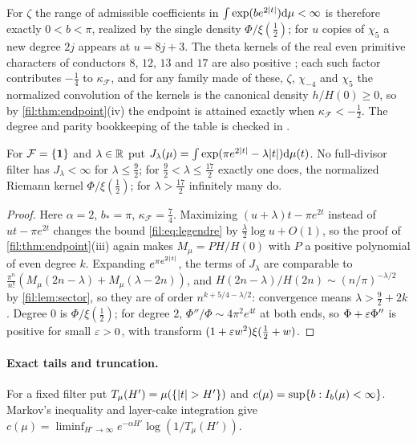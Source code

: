 For $\zeta$ the range of admissible coefficients in $\int\exp(be^{2\lvert t\rvert})\mathrm{d}\mu<\infty$ is therefore exactly
$0<b<\pi$, realized by the single density $\Phi/\xi(\tfrac12)$; for $u$ copies of $\chi_5$ a new degree $2j$
appears at $u=8j+3$. The theta kernels of the real even primitive characters of conductors $8$, $12$, $13$ and
$17$ are also positive \cite{LouboutinMunsch2013Positive}; each such factor contributes $-\tfrac14$ to $\kappa_{\mathcal F}$, and
for any family made of these, $\zeta$, $\chi_{-4}$ and $\chi_5$ the normalized convolution of the kernels is the
canonical density $h/H(0)\ge0$, so by \cref{fil:thm:endpoint}(iv) the endpoint is attained exactly when
$\kappa_{\mathcal F}<-\tfrac12$. The degree and parity bookkeeping of the table is checked in
.

\begin{corollary}\label{fil:cor:zetaweighted}
For $\mathcal F=\{\mathbf{1}\}$ and $\lambda\in\mathbb{R}$ put $J_\lambda(\mu)=\int\exp(\pi e^{2\lvert t\rvert}-\lambda\lvert t\rvert)\mathrm{d}\mu(t)$. No full-divisor
filter has $J_\lambda<\infty$ for $\lambda\le\tfrac92$; for $\tfrac92<\lambda\le\tfrac{17}2$ exactly one does, the normalized
Riemann kernel $\Phi/\xi(\tfrac12)$; for $\lambda>\tfrac{17}2$ infinitely many do.
\end{corollary}

\begin{proof}
Here $\alpha=2$, $b_*=\pi$, $\kappa_{\mathcal F}=\tfrac74$. Maximizing $(u+\lambda)t-\pi e^{2t}$ instead of $ut-\pi e^{2t}$ changes the
bound \eqref{fil:eq:legendre} by $\tfrac\lambda2\log u+O(1)$, so the proof of \cref{fil:thm:endpoint}(iii) again makes
$M_\mu=PH/H(0)$ with $P$ a positive polynomial of even degree $k$. Expanding $e^{\pi e^{2\lvert t\rvert}}$, the terms of
$J_\lambda$ are comparable to $\frac{\pi^n}{n!}(M_\mu(2n-\lambda)+M_\mu(\lambda-2n))$, and
$H(2n-\lambda)/H(2n)\sim(n/\pi)^{-\lambda/2}$ by \cref{fil:lem:sector}, so they are of order $n^{k+5/4-\lambda/2}$:
convergence means $\lambda>\tfrac92+2k$. Degree $0$ is $\Phi/\xi(\tfrac12)$; for degree $2$, $\Phi''/\Phi\sim4\pi^2e^{4t}$ at
both ends, so $\Phi+\varepsilon\Phi''$ is positive for small $\varepsilon>0$, with transform $(1+\varepsilon w^2)\xi(\tfrac12+w)$.
\end{proof}

\paragraph{Exact tails and truncation.}
For a fixed filter put $T_\mu(H')=\mu(\{\lvert t\rvert>H'\})$ and $c(\mu)=\sup\{b:I_b(\mu)<\infty\}$. Markov's inequality and
layer-cake integration give $c(\mu)=\liminf_{H'\to\infty}e^{-\alpha H'}\log(1/T_\mu(H'))$.

